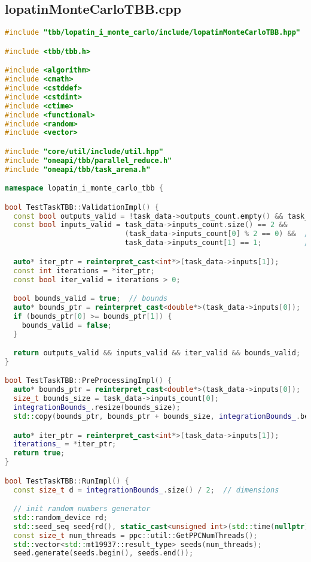\documentclass[12pt,a4paper]{extarticle}
\begin{document}
\subsection{lopatinMonteCarloTBB.cpp}
\begin{lstlisting}[language=C++]
#include "tbb/lopatin_i_monte_carlo/include/lopatinMonteCarloTBB.hpp"

#include <tbb/tbb.h>

#include <algorithm>
#include <cmath>
#include <cstddef>
#include <cstdint>
#include <ctime>
#include <functional>
#include <random>
#include <vector>

#include "core/util/include/util.hpp"
#include "oneapi/tbb/parallel_reduce.h"
#include "oneapi/tbb/task_arena.h"

namespace lopatin_i_monte_carlo_tbb {

bool TestTaskTBB::ValidationImpl() {
  const bool outputs_valid = !task_data->outputs_count.empty() && task_data->outputs_count[0] == 1;
  const bool inputs_valid = task_data->inputs_count.size() == 2 &&
                            (task_data->inputs_count[0] % 2 == 0) &&  // odd num of bounds
                            task_data->inputs_count[1] == 1;          // iterations count

  auto* iter_ptr = reinterpret_cast<int*>(task_data->inputs[1]);
  const int iterations = *iter_ptr;
  const bool iter_valid = iterations > 0;

  bool bounds_valid = true;  // bounds
  auto* bounds_ptr = reinterpret_cast<double*>(task_data->inputs[0]);
  if (bounds_ptr[0] >= bounds_ptr[1]) {
    bounds_valid = false;
  }

  return outputs_valid && inputs_valid && iter_valid && bounds_valid;
}

bool TestTaskTBB::PreProcessingImpl() {
  auto* bounds_ptr = reinterpret_cast<double*>(task_data->inputs[0]);
  size_t bounds_size = task_data->inputs_count[0];
  integrationBounds_.resize(bounds_size);
  std::copy(bounds_ptr, bounds_ptr + bounds_size, integrationBounds_.begin());

  auto* iter_ptr = reinterpret_cast<int*>(task_data->inputs[1]);
  iterations_ = *iter_ptr;
  return true;
}

bool TestTaskTBB::RunImpl() {
  const size_t d = integrationBounds_.size() / 2;  // dimensions

  // init random numbers generator
  std::random_device rd;
  std::seed_seq seed{rd(), static_cast<unsigned int>(std::time(nullptr))};
  const size_t num_threads = ppc::util::GetPPCNumThreads();
  std::vector<std::mt19937::result_type> seeds(num_threads);
  seed.generate(seeds.begin(), seeds.end());


\end{lstlisting}
\end{document}
